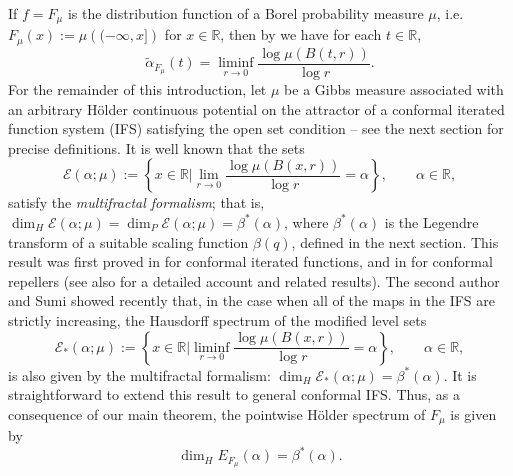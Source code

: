 \documentclass[11pt]{amsart}
\newcommand\RR{\mathbb{R}}
\newcommand\EE{\mathscr{E}}
\newcommand{\1}{1}
\newcommand{\R}{\mathbb{R}}
\begin{document}
If $f=F_\mu$ is the distribution function of a Borel probability measure $\mu$, i.e. $F_{\mu}(x):=\mu\left((-\infty,x]\right)$ for $x\in\RR$,
then by \cite[Lemma 5.1]{JS-2020} we have for each $t\in \R$, \begin{equation}
\tilde{\alpha}_{F_\mu}(t)=\liminf_{r\rightarrow 0}\frac{\log\mu\left(B(t,r)\right)}{\log r}.
\label{eq:hoelder exponent as liminf}
\end{equation}
For the remainder of this introduction, let $\mu$ be a Gibbs measure associated with an arbitrary H\"older continuous potential on the attractor  of a conformal iterated function system (IFS) satisfying the open set condition -- see the next section for precise definitions. It is well known that the sets
\[
\EE(\alpha;\mu):=\left\{ x\in\RR\Big|\lim_{r\rightarrow0}\frac{\log\mu\left(B(x,r)\right)}{\log r}=\alpha\right\}, \qquad\alpha\in\R,
\]
satisfy the {\em multifractal formalism}; that is, $\dim_H \EE(\alpha;\mu)=\dim_P \EE(\alpha;\mu)=\beta^*(\alpha)$, where $\beta^*(\alpha)$ is the Legendre transform of a suitable scaling function $\beta(q)$, defined in the next section. This result was first proved in \cite{Patzschke}  for conformal iterated functions, and in \cite{Pesin-Weiss-97a} for conformal repellers (see also \cite{pesin-dimension-theory}  for a detailed account and related results).
The second author and Sumi \cite{JS-2020} showed recently that, in the case when all of the maps in the IFS are strictly increasing, the Hausdorff spectrum of the modified level sets
\[
\EE_*(\alpha;\mu):=\left\{ x\in\RR\Big|\liminf_{r\rightarrow0}\frac{\log\mu\left(B(x,r)\right)}{\log r}=\alpha\right\}, \qquad\alpha\in\R,
\]
is also given by the multifractal formalism: $\dim_H \EE_*(\alpha;\mu)=\beta^*(\alpha)$. %
It is straightforward to extend this result to general conformal IFS. Thus, as a consequence of our main theorem, the pointwise H\"older spectrum of $F_\mu$ is given by
\[
\dim_H E_{F_\mu}(\alpha)=\beta^*(\alpha).
\]
\end{document}
